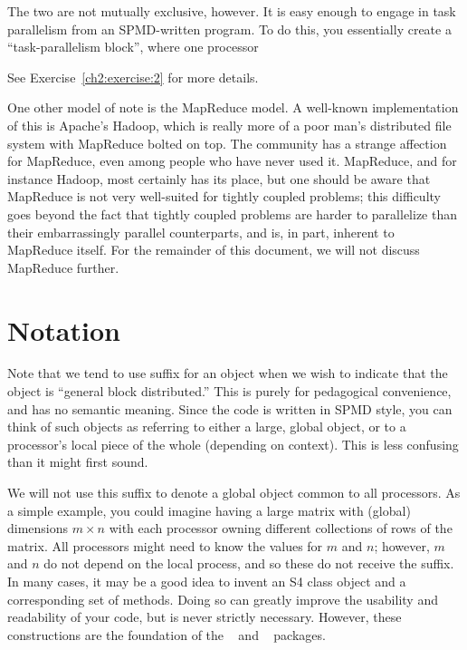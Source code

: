 The two are not mutually exclusive, however.  It is easy enough to engage in task parallelism from an SPMD-written program.  To do this, you essentially create a ``task-parallelism block'', where one processor


See Exercise~\ref{ch2:exercise:2} for more details.

One other model of note is the MapReduce model. 
A well-known implementation of this is Apache's Hadoop, 
which is really more of a poor man's distributed file system with MapReduce 
bolted on top.  The  community has a strange affection for 
MapReduce, even among people who have never used it.  MapReduce, and for 
instance Hadoop, most certainly has its place, but one should be aware that 
MapReduce is not very well-suited for tightly coupled problems; this difficulty 
goes beyond the fact that tightly coupled problems are harder to parallelize 
than their embarrassingly parallel counterparts, and is, in part, inherent to 
MapReduce itself.  For the remainder of this document, we will not discuss 
MapReduce further.  




\section{Notation}
\label{sec:notation}

Note that we tend to use suffix
 for an object when we wish to indicate
that the object is
``general block distributed.''
This is purely for pedagogical convenience,
and has no semantic meaning. Since the code is written in SPMD style, you
can think of such objects as referring to either a large, global object, or
to a processor's local piece of the whole (depending on context).
This is less confusing than it might first sound.

We will not use this suffix to denote a global object common to all processors.
As a simple example, you could imagine having a large matrix with (global)
dimensions $m\times n$ with each processor owning different collections of
rows of the matrix. All processors might need to know the values for
$m$ and $n$; however, $m$ and $n$ do not depend on the local process, and
so these do not receive the  suffix. In many cases, it may be
a good idea to invent an S4 class object and a corresponding set of methods.
Doing so can greatly improve the usability and readability of your code, but
is never strictly necessary. However, these constructions are the foundation
of the
~\citep{Schmidt2012pbdBASEpackage} and
~\citep{Schmidt2012pbdDMATpackage} packages.

